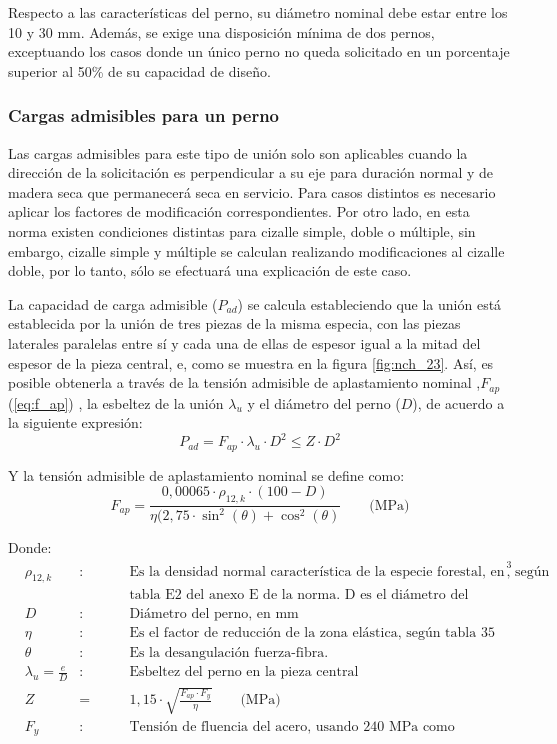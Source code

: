 Respecto a las características del perno, su diámetro nominal debe estar entre los 10 y 30 mm. Además, se exige una disposición mínima de dos pernos, exceptuando los casos donde un único perno no queda solicitado en un porcentaje superior al 50\% de su capacidad de diseño.

\subsubsection{Cargas admisibles para un perno}
Las cargas admisibles para este tipo de unión solo son aplicables cuando la dirección de la solicitación es perpendicular a su eje para duración normal y de madera seca que permanecerá seca en servicio. Para casos distintos es necesario aplicar los factores de modificación correspondientes. Por otro lado, en esta norma existen condiciones distintas para cizalle simple, doble o múltiple, sin embargo, cizalle simple y múltiple se calculan realizando modificaciones al cizalle doble, por lo tanto, sólo se efectuará una explicación de este caso.

La capacidad de carga admisible ($P_{ad}$) se calcula estableciendo que la unión está establecida por la unión de tres piezas de la misma especia, con las piezas laterales paralelas entre sí y cada una de ellas de espesor igual a la mitad del espesor de la pieza central, e, como se muestra en la figura \ref{fig:nch_23}. Así, es posible obtenerla a través de la tensión admisible de aplastamiento nominal ,$F_{ap}$ (\ref{eq:f_ap}) , la esbeltez de la unión $\lambda_u$ y el diámetro del perno ($D$), de acuerdo a la siguiente expresión:
\begin{equation} \label{eq:padm_ad}
	P_{ad} = F_{ap} \cdot \lambda_u \cdot D^2 \leq Z \cdot D^2
\end{equation}

Y la tensión admisible de aplastamiento nominal se define como:
\begin{equation}\label{eq:f_ap}
	F_{ap} = \frac{0,00065\cdot \rho_{12,k}\cdot (100 - D)}{\eta (2,75\cdot \sin^2(\theta) + \cos^2(\theta)} \qquad \text{(MPa)}
\end{equation}


Donde:
\begin{align*}
&\rho_{12,k} &: \qquad &\text{Es la densidad normal característica de la especie forestal, en kg/m}^3 \text{, según}\\
& & & \text{tabla E2 del anexo E de la norma. D es el diámetro del perno, en mm.}\\
&D &: \qquad &\text{Diámetro del perno, en mm}\\
&\eta &: \qquad &\text{Es el factor de reducción de la zona elástica, según tabla 35 de la norma.}\\
&\theta &: \qquad &\text{Es la desangulación fuerza-fibra.}\\
&\lambda_u = \frac{e}{D} &: \qquad &\text{Esbeltez del perno en la pieza central}\\
&Z &= \qquad &1,15\cdot \sqrt{\frac{F_{ap} \cdot F_y}{\eta}} \qquad \text{(MPa)}\\
&F_y &: \qquad &\text{Tensión de fluencia del acero, usando 240 MPa como referencia} 
\end{align*}

